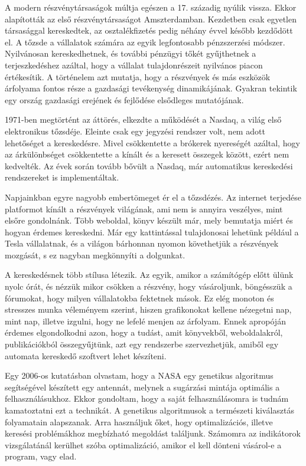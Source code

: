 A modern részvénytársaságok múltja egészen a 17. századig nyúlik vissza. Ekkor alapították az első részvénytársaságot Amszterdamban. Kezdetben csak egyetlen társasággal kereskedtek, az osztalékfizetés pedig néhány évvel később kezdődött el.
A tőzsde a vállalatok számára az egyik legfontosabb pénzszerzési módszer. Nyilvánosan kereskedhetnek, és további pénzügyi tőkét gyűjthetnek a terjeszkedéshez azáltal, hogy a vállalat tulajdonrészeit nyilvános piacon értékesítik. A történelem azt mutatja, hogy a részvények és más eszközök árfolyama fontos része a gazdasági tevékenység dinamikájának. Gyakran tekintik egy ország gazdasági erejének és fejlődése elsődleges mutatójának.

1971-ben megtörtént az áttörés, elkezdte a működését a Nasdaq, a világ első elektronikus tőzsdéje. Eleinte csak egy jegyzési rendszer volt, nem adott lehetőséget a kereskedésre. Mivel csökkentette a brókerek nyereségét azáltal, hogy az árkülönbséget csökkentette a kínált és a keresett összegek között, ezért nem kedvelték. Az évek során tovább bővült a Nasdaq, már automatikus kereskedési rendszereket is implementáltak.

Napjainkban egyre nagyobb embertömeget ér el a tőzsdézés. Az internet terjedése platformot kínált a részvények világának, ami nem is annyira veszélyes, mint elsőre gondolnánk. Több weboldal, könyv készült már, mely bemutatja miért és hogyan érdemes kereskedni. Már egy kattintással tulajdonosai lehetünk például a Tesla vállalatnak, és a világon bárhonnan nyomon követhetjük a részvények mozgását, s ez nagyban megkönnyíti a dolgunkat.

A kereskedésnek több stílusa létezik. Az egyik, amikor a számítógép előtt ülünk nyolc órát, és nézzük mikor csökken a részvény, hogy vásároljunk, böngésszük a fórumokat, hogy milyen vállalatokba fektetnek mások. Ez elég monoton és stresszes munka véleményem szerint, hiszen grafikonokat kellene nézegetni nap, mint nap, illetve izgulni, hogy ne lefelé menjen az árfolyam. Ennek apropóján érdemes elgondolkodni azon, hogy a tudást, amit könyvekből, weboldalakról, publikációkból összegyűjtünk, azt egy rendszerbe szervezhetjük, amiből egy automata kereskedő szoftvert lehet készíteni.

Egy 2006-os kutatásban olvastam, hogy a NASA egy genetikus algoritmus segítségével készített egy antennát, melynek a sugárzási mintája optimális a felhasználásukhoz. Ekkor gondoltam, hogy a saját felhasználásomra is tudnám kamatoztatni ezt a technikát. A genetikus algoritmusok a természeti kiválasztás folyamatain alapszanak. Arra használjuk őket, hogy optimalizációs, illetve keresési problémákhoz megbízható megoldást találjunk. Számomra az indikátorok vizsgálatánál kerülhet szóba optimalizáció, amikor el kell dönteni vásárol-e a program, vagy elad.

